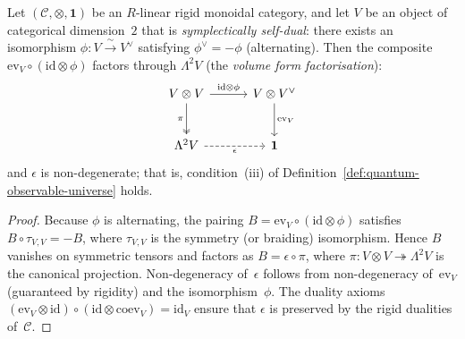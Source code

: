 \begin{lemma}
\label{lem:volume-from-rigidity}
Let $(\mathcal{C}, \otimes, \mathbf{1})$ be an $R$-linear rigid monoidal
category, and let $V$ be an object of categorical dimension~$2$ that is
\emph{symplectically self-dual}: there exists an isomorphism
$\phi \colon V \xrightarrow{\;\sim\;} V^{\vee}$ satisfying
$\phi^{\vee} = -\phi$ (alternating).  Then the composite
$\mathrm{ev}_V \circ (\mathrm{id} \otimes \phi)$ factors through
$\Lambda^2 V$ (the \emph{volume form factorisation}):
\begin{equation}\label{eq:volume-form-factorisation}
\begin{tikzcd}[row sep=2.5em, column sep=3em]
  V \otimes V
    \ar[r, "\mathrm{id} \otimes \phi"]
    \ar[d, "\pi"', two heads]
  & V \otimes V^{\vee}
    \ar[d, "\mathrm{ev}_V"]
  \\
  \Lambda^2 V
    \ar[r, "\epsilon"', dashed]
  & \mathbf{1}
\end{tikzcd}
\end{equation}
and $\epsilon$ is non-degenerate; that is,
condition~\textup{(iii)} of
Definition~\textup{\ref{def:quantum-observable-universe}} holds.
\end{lemma}

\begin{proof}
Because $\phi$ is alternating, the pairing
$B = \mathrm{ev}_V \circ (\mathrm{id} \otimes \phi)$ satisfies
$B \circ \tau_{V,V} = -B$, where $\tau_{V,V}$ is the symmetry (or
braiding) isomorphism.  Hence $B$ vanishes on symmetric tensors and
factors as $B = \epsilon \circ \pi$, where
$\pi \colon V \otimes V \twoheadrightarrow \Lambda^2 V$ is the
canonical projection.  Non-degeneracy of~$\epsilon$ follows from
non-degeneracy of~$\mathrm{ev}_V$ (guaranteed by rigidity) and the
isomorphism~$\phi$.  The duality axioms
$(\mathrm{ev}_V \otimes \mathrm{id}) \circ
(\mathrm{id} \otimes \mathrm{coev}_V) = \mathrm{id}_V$ ensure that
$\epsilon$ is preserved by the rigid dualities of~$\mathcal{C}$.
\end{proof}

